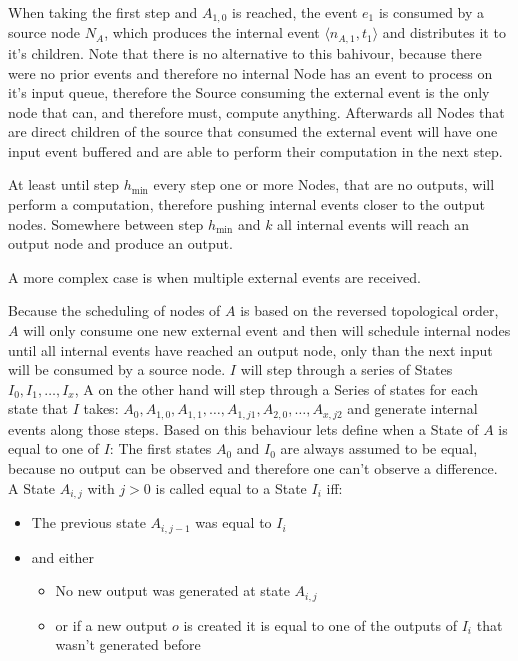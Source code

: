 When taking the first step and \(A_{1,0}\) is reached, the event \(e_1\) is consumed by a source node \(N_A\), which produces
the internal event \(\langle n_{A,1},t_1\rangle\) and distributes it to it's children.
Note that there is no alternative to this bahivour, because there were no prior events and therefore no internal Node
has an event to process on it's input queue, therefore the Source consuming the external event is the only node that can,
and therefore must, compute anything.
Afterwards all Nodes that are direct children of the source that consumed the external event will have one input event buffered and
are able to perform their computation in the next step.

At least until step \(h_{\min}\) every step one or more Nodes, that are no outputs, will perform a computation, therefore
pushing internal events closer to the output nodes.
Somewhere between step \(h_{\min}\) and \(k\) all internal events will reach an output node and produce an output.

A more complex case is when multiple external events are received.

Because the scheduling of nodes of \(A\) is based on the reversed topological order, \(A\) will only consume one new external event and then will schedule internal nodes until all
internal events have reached an output node, only than the next input will be consumed by a source node.
\(I\) will step through a series of States \(I_0, I_1, \dots, I_x\), A on the other hand will step through a Series of
states for each state that \(I\) takes: \(A_0,A_{1,0},A_{1,1},\dots,A_{1,j1},A_{2,0}, \dots,A_{x,j2}\) and generate internal events along those steps.
Based on this behaviour lets define when a State of \(A\) is equal to one of \(I\):
The first states \(A_0\) and \(I_0\) are always assumed to be equal, because no output can be observed and therefore one
can't observe a difference.
A State \(A_{i,j}\) with \(j > 0\) is called equal to a State \(I_{i}\) iff:

\begin{itemize}
  \item The previous state \(A_{i,j-1}\) was equal to \(I_{i}\)
  \item and either
    \begin{itemize}
      \item No new output was generated at state \(A_{i,j}\)
      \item or if a new output \(o\) is created it is equal to one of the outputs of \(I_{i}\) that wasn't generated before
    \end{itemize}
\end{itemize}

